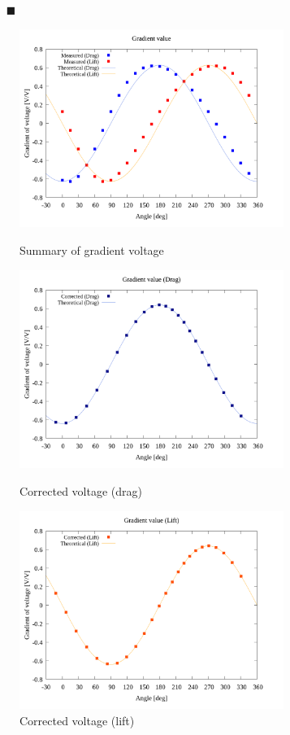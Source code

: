 \documentclass[twocolumn,a4j]{jsarticle}
\begin{document}
\newpage

\begin{itemize}
    \item [$\blacksquare$] 
\end{itemize}

\begin{figure}[htbp]
    \footnotesize
    \begin{center}
        \includegraphics[width=86mm]{../graphes/offset_x=5_y=5/20/20_adjust-value.png}
        \caption{Summary of gradient voltage}
        \includegraphics[width=86mm]{../graphes/offset_x=5_y=5/21/21-2_corrected_offset_drag.png}
        \caption{Corrected voltage (drag)}
        \includegraphics[width=86mm]{../graphes/offset_x=5_y=5/21/21-2_corrected_offset_lift.png}
        \caption{Corrected voltage (lift)}
    \end{center}
\end{figure}
\end{document}
